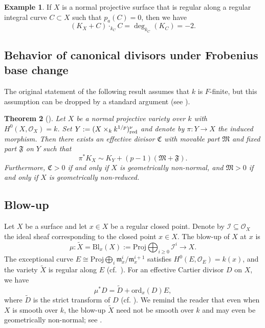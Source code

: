 \documentclass[reqno,oneside]{amsart}
\newtheorem{theorem}{Theorem}[section]
\theoremstyle{definition}
\newtheorem{example}[theorem]{Example}
\theoremstyle{plain}
\numberwithin{equation}{section}
\begin{document}
\begin{example}
 If $X$ is a normal projective surface that is regular along a regular integral curve $C \subset X$ such that $p_a(C) = 0$, then we have \[
  (K_X + C) \cdot_{k_C} C = \deg_{k_C} (K_C) = -2.
 \]
\end{example}

\subsection{Behavior of canonical divisors under Frobenius base change}\label{subsection-geo-non-reduced}
The original statement of the following result assumes that $k$ is $F$-finite, but this assumption can be dropped by a standard argument (see \cite[p.~3917]{Das-Waldron-2022}).
\begin{theorem}[{\cite[Theorem~1.1]{ji_structure_2021}}]\label{theorem-can-bc}
  Let $X$ be a normal projective variety over $k$ with $H^0(X,\mathcal{O}_X) = k$.
  Set $Y := (X \times_k k^{1/p})_{\rm red}^\nu$ and denote by $\pi\colon Y\to X$ the induced morphism.
  Then there exists an effective divisor $\mathfrak C$ with movable part $\mathfrak{M}$ and fixed part $\mathfrak{F}$ on $Y$ such that \[
    \pi^*K_X \sim K_{Y} + (p-1)(\mathfrak{M} + \mathfrak{F}).
  \]
  Furthermore, $\mathfrak C > 0$ if and only if $X$ is geometrically non-normal, and $\mathfrak M>0$ if and only if $X$ is geometrically non-reduced.
\end{theorem}

\subsection{Blow-up}\label{section-bl}
Let $X$ be a surface and let $x\in X$ be a regular closed point.
Denote by $\mathcal{I} \subseteq \mathcal{O}_X$ the ideal sheaf corresponding to the closed point $x\in X$.
The blow-up of $X$ at $x$ is \[
 \mu: \widetilde{X} = \mathrm{Bl}_x(X) := \mathrm{Proj} \bigoplus_{i\ge0} \mathcal{I}^i \to X .
\]
The exceptional curve $E\cong \mathrm{Proj} \bigoplus_i \mathfrak m^i_x / \mathfrak m_x^{i+1}$ satisfies $H^0(E,\mathcal{O}_E) = k(x)$, and the variety
$\widetilde{X}$ is regular along $E$ (cf.~\cite[Proposition~3.1]{Liu2025}).
For an effective Cartier divisor $D$ on $X$, we have
  \begin{equation}
    \mu^* D = \widetilde{D} + \mathrm{ord}_x(D) E,
  \end{equation}
  where $\widetilde{D}$ is the strict transform of $D$ (cf. \cite[Example~4.3.9]{fulton_intersection_theory}).
  We remind the reader that even when $X$ is smooth over $k$, the blow-up $\widetilde{X}$ need not be smooth over $k$ and may even be geometrically non-normal; see \cite[Remark~2.7]{BFSZ2404}.
\end{document}
